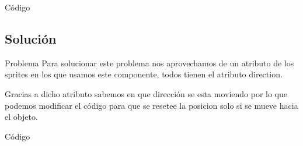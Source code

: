 \documentclass{beamer}
\begin{document}
\begin{frame}{Código}
  
\end{frame}

\subsection{Solución}

\begin{frame}{Problema}
Para solucionar este problema nos aprovechamos de un atributo de los
sprites en los que usamos este componente, todos tienen el atributo direction.

\medskip

Gracias a dicho atributo sabemos en que dirección se esta moviendo por lo que
podemos modificar el código para que se resetee la posicion solo si se mueve
hacia el objeto.
\end{frame}

\begin{frame}{Código}
  
\end{frame}
\end{document}
